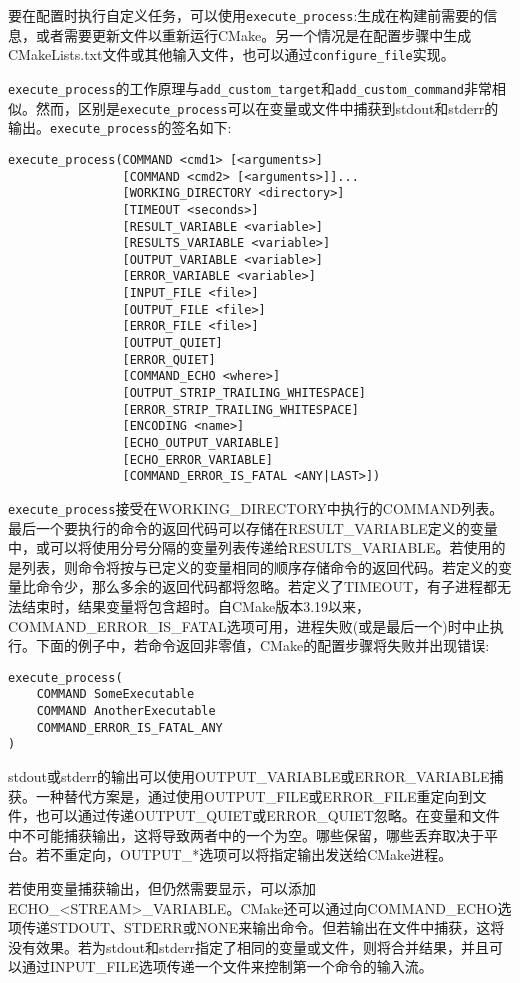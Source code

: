 
要在配置时执行自定义任务，可以使用\texttt{execute\_process}:生成在构建前需要的信息，或者需要更新文件以重新运行CMake。另一个情况是在配置步骤中生成CMakeLists.txt文件或其他输入文件，也可以通过\texttt{configure\_file}实现。

\texttt{execute\_process}的工作原理与\texttt{add\_custom\_target}和\texttt{add\_custom\_command}非常相似。然而，区别是\texttt{execute\_process}可以在变量或文件中捕获到stdout和stderr的输出。\texttt{execute\_process}的签名如下:

\begin{lstlisting}[style=styleCMake]
execute_process(COMMAND <cmd1> [<arguments>]
				[COMMAND <cmd2> [<arguments>]]...
				[WORKING_DIRECTORY <directory>]
				[TIMEOUT <seconds>]
				[RESULT_VARIABLE <variable>]
				[RESULTS_VARIABLE <variable>]
				[OUTPUT_VARIABLE <variable>]
				[ERROR_VARIABLE <variable>]
				[INPUT_FILE <file>]
				[OUTPUT_FILE <file>]
				[ERROR_FILE <file>]
				[OUTPUT_QUIET]
				[ERROR_QUIET]
				[COMMAND_ECHO <where>]
				[OUTPUT_STRIP_TRAILING_WHITESPACE]
				[ERROR_STRIP_TRAILING_WHITESPACE]
				[ENCODING <name>]
				[ECHO_OUTPUT_VARIABLE]
				[ECHO_ERROR_VARIABLE]
				[COMMAND_ERROR_IS_FATAL <ANY|LAST>])
\end{lstlisting}

\texttt{execute\_process}接受在WORKING\_DIRECTORY中执行的COMMAND列表。最后一个要执行的命令的返回代码可以存储在RESULT\_VARIABLE定义的变量中，或可以将使用分号分隔的变量列表传递给RESULTS\_VARIABLE。若使用的是列表，则命令将按与已定义的变量相同的顺序存储命令的返回代码。若定义的变量比命令少，那么多余的返回代码都将忽略。若定义了TIMEOUT，有子进程都无法结束时，结果变量将包含超时。自CMake版本3.19以来，COMMAND\_ERROR\_IS\_FATAL选项可用，进程失败(或是最后一个)时中止执行。下面的例子中，若命令返回非零值，CMake的配置步骤将失败并出现错误:

\begin{lstlisting}[style=styleCMake]
execute_process(
	COMMAND SomeExecutable
	COMMAND AnotherExecutable
	COMMAND_ERROR_IS_FATAL_ANY
)
\end{lstlisting}

stdout或stderr的输出可以使用OUTPUT\_VARIABLE或ERROR\_VARIABLE捕获。一种替代方案是，通过使用OUTPUT\_FILE或ERROR\_FILE重定向到文件，也可以通过传递OUTPUT\_QUIET或ERROR\_QUIET忽略。在变量和文件中不可能捕获输出，这将导致两者中的一个为空。哪些保留，哪些丢弃取决于平台。若不重定向，OUTPUT\_*选项可以将指定输出发送给CMake进程。

若使用变量捕获输出，但仍然需要显示，可以添加ECHO\_<STREAM>\_VARIABLE。CMake还可以通过向COMMAND\_ECHO选项传递STDOUT、STDERR或NONE来输出命令。但若输出在文件中捕获，这将没有效果。若为stdout和stderr指定了相同的变量或文件，则将合并结果，并且可以通过INPUT\_FILE选项传递一个文件来控制第一个命令的输入流。


